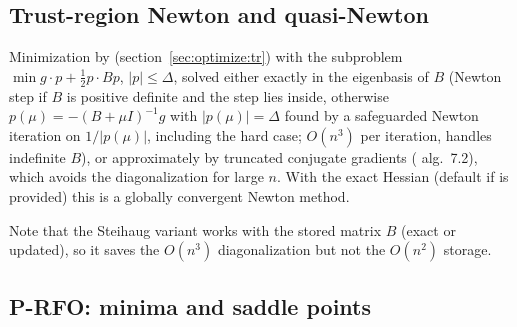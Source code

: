 \subsection{Trust-region Newton and quasi-Newton}

Minimization by  (section~\ref{sec:optimize:tr}) with the subproblem
$\min g\cdot p+\frac12p\cdot Bp$, $|p|\le\Delta$, solved either exactly in the eigenbasis of $B$ \cite{optimize:more1983}
(Newton step if $B$ is positive definite and the step lies inside, otherwise $p(\mu)=-(B+\mu I)^{-1}g$ with $|p(\mu)|=\Delta$
found by a safeguarded Newton iteration on $1/|p(\mu)|$, including the hard case; $O(n^3)$ per iteration, handles indefinite
$B$), or approximately by truncated conjugate gradients \cite{optimize:steihaug1983} (\cite{optimize:nocedal2006} alg.~7.2),
which avoids the diagonalization for large $n$. With the exact Hessian (default if  is provided) this is a
globally convergent Newton method.
\begin{lareference}
\end{lareference}
Note that the Steihaug variant works with the stored matrix $B$ (exact or updated), so it saves the $O(n^3)$ diagonalization but
not the $O(n^2)$ storage.

\subsection{P-RFO: minima and saddle points}

